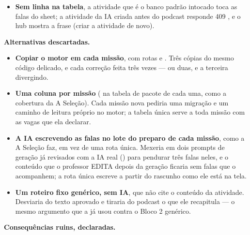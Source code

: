 \begin{itemize}
    forçada), gravada pela homologação do Jornal
    () e pela aprovação do Quem Mandou Isso?
    () \textbf{na mesma transação} --- inclusive no
    segundo clique, que devolve o pacote existente. \textbf{A A Seleção não usa
    a tabela}: as falas dela continuam nascendo no lote do preparo e morando
    na cobertura (), e a fonte dela as
    entrega prontas.
  \item \textbf{Sem linha na tabela}, a atividade que é o banco padrão
    intocado toca as falas do sheet; a atividade da IA criada antes do podcast
    responde 409 , e o hub mostra a frase (criar a
    atividade de novo).
\end{itemize}

\textbf{Alternativas descartadas.}

\begin{itemize}
  \item \textbf{Copiar o motor em cada missão}, com rotas
     e . Três
    cópias do mesmo código delicado, e cada correção feita três vezes --- ou
    duas, e a terceira divergindo.
  \item \textbf{Uma coluna por missão} ( na tabela de pacote de
    cada uma, como a cobertura da A Seleção). Cada missão nova pediria uma
    migração e um caminho de leitura próprio no motor; a tabela única serve a
    toda missão com as vagas que ela declarar.
  \item \textbf{A IA escrevendo as falas no lote do preparo de cada missão},
    como a A Seleção faz, em vez de uma rota única. Mexeria em dois prompts de
    geração já revisados com a IA real () para pendurar três
    falas neles, e o conteúdo que o professor EDITA depois da geração ficaria
    sem falas que o acompanhem; a rota única escreve a partir do rascunho como
    ele está na tela.
  \item \textbf{Um roteiro fixo genérico, sem IA}, que não cite o conteúdo da
    atividade. Desviaria do texto aprovado e tiraria do podcast o que ele
    recapitula --- o mesmo argumento que a  já usou contra o
    Bloco 2 genérico.
\end{itemize}

\textbf{Consequências ruins, declaradas.}

